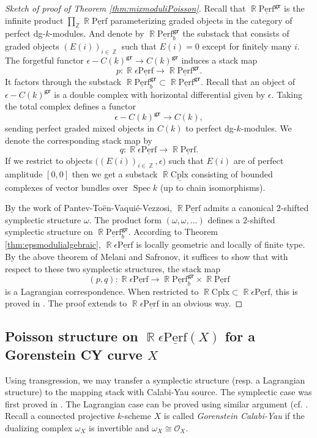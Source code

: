 \documentclass[reqno]{amsart}
\DeclareMathOperator\Z{\mathbb Z}
\DeclareMathOperator\R{\mathbb R}
\theoremstyle{definition}
\theoremstyle{remark}
\newcommand{\ul}{\underline}
\newcommand{\Spec}{\operatorname{Spec}}
\newcommand{\eps}{\epsilon}
\newcommand{\cplx}{{\mathrm{Cplx}}}
\newcommand{\uperf}{\ul{\mathrm{Perf}}}
\newcommand{\gr}{\mathbf{gr}}
\newcommand{\cO}{\mathcal{O}}
\newcommand{\ep}{\epsilon}
\numberwithin{equation}{section}
\begin{document}
\begin{proof}[Sketch of proof of Theorem \ref{thm:mixmoduliPoisson}]
Recall that $\R\uperf^\gr$ is the infinite product $\prod_{\Z}\R\uperf$ parameterizing graded objects in the category of perfect dg-$k$-modules. And denote by $\R\uperf^{\gr}_b$ the substack that consists of graded objects $(E(i))_{i\in\Z}$ such that $E(i)=0$ except for finitely many $i$. The forgetful functor $\ep-C(k)^\gr\to C(k)^\gr$ induces a stack map
\[
p: \R\eps\uperf\to \R\uperf^\gr.
\] It factors through the substack $\R\uperf^\gr_b\subset \R\uperf^\gr$. Recall that an object of $\ep-C(k)^\gr$ is a double complex with horizontal differential given by $\ep$. Taking the total complex defines a functor 
\[
\ep-C(k)^\gr\to C(k),
\] sending   perfect graded mixed objects in $C(k)$ to perfect dg-$k$-modules. We denote the corresponding stack map by
\[
q: \R\eps\uperf\to \R\uperf.
\]
If we restrict to objects $\Big((E(i))_{i\in\Z},\ep\Big)$ such that $E(i)$ are of perfect amplitude $[0,0]$ then we get a substack $\R\ul\cplx$ consisting of bounded complexes of vector bundles over $\Spec k$ (up to chain isomorphisms).

By the work of Pantev-To\"en-Vaqui\'e-Vezzosi, $\R\uperf$ admits a canonical $2$-shifted symplectic structure $\omega$. The product form $(\omega,\omega,\ldots)$ defines a $2$-shifted symplectic structure on $\R\uperf^\gr_b$. According to Theorem \ref{thm:epsmodulialgebraic}, $\R\eps\uperf$ is locally geometric and locally of finite type. By the above theorem of Melani and Safronov, it suffices to show that with respect to these two symplectic structures, the stack map 
\[
(p,q): \R\eps\uperf\to \R\uperf^\gr_b\times\R\uperf
\] is a Lagrangian correspondence. 
When restricted to $\R\cplx\subset \R\eps\uperf$, this is proved in \cite[Theorem 3.13]{HP1}. The proof extends to $\R\eps\uperf$ in an obvious way.
\end{proof}




\subsection{Poisson structure on $\R\eps\uperf(X)$ for a Gorenstein CY curve $X$}\label{sec:Poieps}
Using transgression, we may transfer a symplectic structure (resp. a Lagrangian structure) to the mapping stack with Calabi-Yau source. The symplectic case was first proved in \cite[Theorem 2.5]{PTVV}. The Lagrangian case can be proved using similar argument (cf. \cite[Theorem 2.10]{Ca14}. Recall a connected projective $k$-scheme $X$ is called \emph{Gorenstein Calabi-Yau} if the dualizing complex $\omega_X$ is invertible and $\omega_X\cong\cO_X$.
\end{document}
